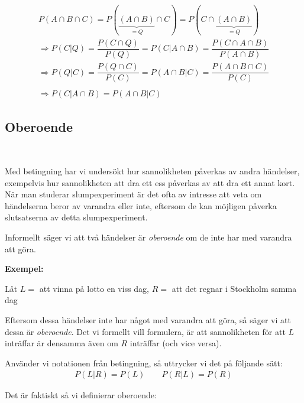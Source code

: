 \begin{equation*}
  \begin{gathered}
    P(A\cap B\cap C) = P(\underbrace{(A\cap B)}_{\text{$=Q$}}\cap C) = P(C\cap\underbrace{(A\cap B)}_{\text{$=Q$}})\\
    \Rightarrow P(C|Q) = \dfrac{P(C\cap Q)}{P(Q)} = P(C|A\cap B) = \dfrac{P(C\cap A\cap B)}{P(A\cap B)}\\
    \Rightarrow P(Q|C) = \dfrac{P(Q\cap C)}{P(C)} = P(A\cap B|C) = \dfrac{P(A\cap B\cap C)}{P(C)}\\\\
    \Rightarrow P(C|A\cap B) = P(A\cap B|C)
  \end{gathered}
\end{equation*}
\par\bigskip
\subsection{Oberoende}\hfill\\\par
\noindent Med betingning har vi undersökt hur sannolikheten påverkas av andra händelser, exempelvis hur sannolikheten att dra ett ess påverkas av att dra ett annat kort. När man studerar slumpexperiment är det ofta av intresse att veta om händelserna beror av varandra eller inte, eftersom de kan möjligen påverka slutsatserna av detta slumpexperiment.
\par\bigskip
\noindent Informellt säger vi att två händelser är \textit{oberoende} om de inte har med varandra att göra.
\par\bigskip
\noindent\textbf{Exempel:}\par
\noindent Låt $L=$ att vinna på lotto en viss dag, $R=$ att det regnar i Stockholm samma dag\par
\noindent Eftersom dessa händelser inte har något med varandra att göra, så säger vi att dessa är \textit{oberoende}. Det vi formellt vill formulera, är att sannolikheten för att $L$ inträffar är densamma även om $R$ inträffar (och vice versa).\par
\noindent Använder vi notationen från betingning, så uttrycker vi det på följande sätt:
\begin{equation*}
  \begin{gathered}
    P(L|R) = P(L)\qquad P(R|L) = P(R)
  \end{gathered}
\end{equation*}\par
\noindent Det är faktiskt så vi definierar oberoende:
